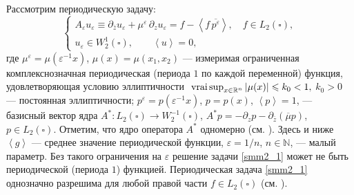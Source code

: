 %
%
%



Рассмотрим периодическую задачу:
\begin{equation}\label{smm2_1}
   \left\{\begin{array}{l}
A_\varepsilon u_\varepsilon\equiv\partial_{\bar{z}}u_\varepsilon+\mu^{\varepsilon}\,\partial_z u_\varepsilon
=f-\left<f\,\overline{p^\varepsilon}\right>,\quad f\in L_2(\square), \\[3mm]
   u_\varepsilon\in W^1_2(\square),\qquad \left<u\right>=0,
\end{array}\right.
\end{equation}
где   $\mu^\varepsilon=\mu(\varepsilon^{-1}x)$, $\mu(x)=\mu(x_1,x_2)$
 --- измеримая ограниченная комплекснозначная периодическая
 (периода $1$ по каждой переменной)
функция, удовлетворяющая условию эллиптичности
$
    \textrm{ vrai\,sup}_{x\in \mathbb{R}^n}\left|\mu(x)\right|\leqslant k_0 <1,
$
 $k_0>0$ --- постоянная эллиптичности; $p^\varepsilon=p(\varepsilon^{-1}x)$,
$p=p(x)$, $\left\langle p\right\rangle=1$, --- базисный вектор ядра $A^\ast: L_2(\square)\to W^{-1}_2(\square)$, $A^* p=-\partial_z p-\partial_{\overline z} (\overline\mu p)$,      $p\in L_2 (\square )$.
Отметим, что ядро оператора $A^\ast$ одномерно (см. \cite{smm_ZhKO}).
Здесь
и ниже $\left\langle g\right\rangle$ --- среднее значение периодической функции, $\varepsilon=1/n$, $n\in \mathbb{N}$,
 --- малый параметр. Без такого ограничения на $\varepsilon$ решение задачи
 \eqref{smm2_1} может не быть периодической (периода $1$) функцией.
%
 Периодическая
 задача \eqref{smm2_1} однозначно разрешима для любой правой части
 $f\in L_2(\square)$ (см. \cite{smm_SDZ}).

